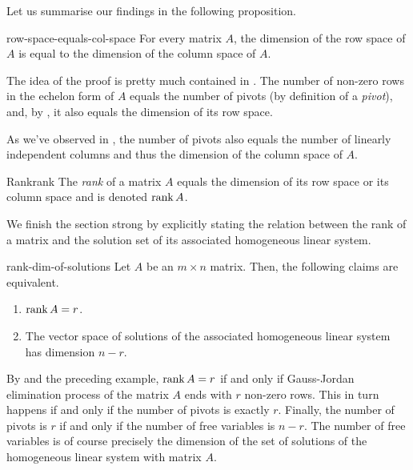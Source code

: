 Let us summarise our findings in the following proposition.

\begin{proposition}{}{row-space-equals-col-space}
 For every matrix $A$, the dimension of the row space of $A$ is equal to the
 dimension of the column space of $A$.
\end{proposition}
\begin{propproof}
 The idea of the proof is pretty much contained in
 . The number of non-zero rows in the
 echelon form of $A$ equals the number of pivots (by definition of a
 \emph{pivot}), and, by , it also equals the
 dimension of its row space.

 As we've observed in , the number of
 pivots also equals the number of linearly independent columns and thus the
 dimension of the column space of $A$.
\end{propproof}

\begin{definition}{Rank}{rank}
 The \emph{rank} of a matrix $A$ equals the dimension of its row space or its
 column space and is denoted $\operatorname{rank} A$.
\end{definition}

We finish the section strong by explicitly stating the relation between the rank
of a matrix and the solution set of its associated homogeneous linear system.

\begin{theorem}{}{rank-dim-of-solutions}
 Let $A$ be an $m \times n$ matrix. Then, the following claims are equivalent.
 \begin{enumerate}
  \item $\operatorname{rank} A = r$.
  \item The vector space of solutions of the associated homogeneous linear
   system has dimension $n - r$.
 \end{enumerate}
\end{theorem}
\begin{thmproof}
 By  and the preceding
 example, $\operatorname{rank} A = r$ if and only if Gauss-Jordan elimination process of the
 matrix $A$ ends with $r$ non-zero rows. This in turn happens if and only if the
 number of pivots is exactly $r$. Finally, the number of pivots is $r$ if and
 only if the number of free variables is $n - r$. The number of free variables
 is of course precisely the dimension of the set of solutions of the homogeneous
 linear system with matrix $A$.
\end{thmproof}

